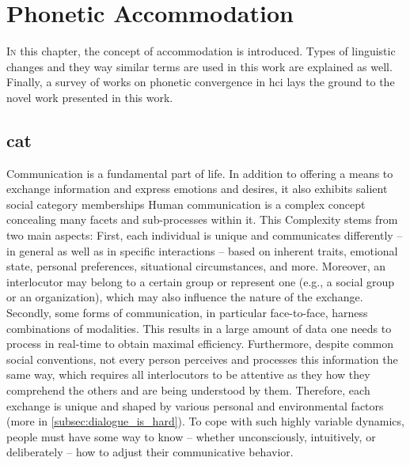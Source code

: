 \chapter{Phonetic Accommodation}
\label{chap:phonetic_convergence}

\lettrine{I}{n} this chapter, the concept of accommodation is introduced.
Types of linguistic changes and they way similar terms are used in this work are explained as well.
Finally, a survey of works on phonetic convergence in \acl{hci} lays the ground to the novel work presented in this work.

\pagebreak

\acresetall

\section{\Acl{cat}}
\label{sec:communication_accommodation_theory}

Communication is a fundamental part of life.
In addition to offering a means to exchange information and express emotions and desires, it also exhibits salient social category memberships
Human communication is a complex concept concealing many facets and sub-processes within it.
This Complexity stems from two main aspects:
First, each individual is unique and communicates differently -- in general as well as in specific interactions -- based on inherent traits, emotional state, personal preferences, situational circumstances, and more.
Moreover, an interlocutor may belong to a certain group or represent one (e.g., a social group or an organization), which may also influence the nature of the exchange.
Secondly, some forms of communication, in particular face-to-face, harness combinations of modalities.
This results in a large amount of data one needs to process in real-time to obtain maximal efficiency.
Furthermore, despite common social conventions, not every person perceives and processes this information the same way, which requires all interlocutors to be attentive as they how they comprehend the others and are being understood by them.
Therefore, each exchange is unique and shaped by various personal and environmental factors (more in \cref{subsec:dialogue_is_hard}).
To cope with such highly variable dynamics, people must have some way to know -- whether unconsciously, intuitively, or deliberately -- how to adjust their communicative behavior.

